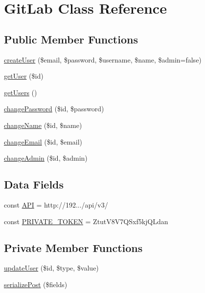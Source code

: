 \hypertarget{class_git_lab}{}\section{Git\+Lab Class Reference}
\label{class_git_lab}
\subsection*{Public Member Functions}
\begin{DoxyCompactItemize}
\item 
\hyperlink{class_git_lab_ad4673e3ab86e44e554d444421241a8a1}{create\+User} (\$email, \$password, \$username, \$name, \$admin=false)
\item 
\hyperlink{class_git_lab_a2b589778b482371e1539bc994300c1e5}{get\+User} (\$id)
\item 
\hyperlink{class_git_lab_a0fc10b64683021b70c7eb95fb514c119}{get\+Users} ()
\item 
\hyperlink{class_git_lab_a592a238ea58e065b512fc723304f7f29}{change\+Password} (\$id, \$password)
\item 
\hyperlink{class_git_lab_aea3aab26df5bf7398aea5e84d2a85129}{change\+Name} (\$id, \$name)
\item 
\hyperlink{class_git_lab_a4c1dd994f79ecf289df6fc1f91c0e19e}{change\+Email} (\$id, \$email)
\item 
\hyperlink{class_git_lab_ad0088df13f1b2dd3eec34f0984ac07e4}{change\+Admin} (\$id, \$admin)
\end{DoxyCompactItemize}
\subsection*{Data Fields}
\begin{DoxyCompactItemize}
\item 
const \hyperlink{class_git_lab_ad629fa048bd788fc4a4ed613628423cb}{A\+P\+I} = \textquotesingle{}http\+://192.../api/v3/\textquotesingle{}
\item 
const \hyperlink{class_git_lab_a7bd2a018127059c3e72902d45e7913d0}{P\+R\+I\+V\+A\+T\+E\+\_\+\+T\+O\+K\+E\+N} = \textquotesingle{}Ztut\+V8\+V7\+Q\+Sxf5kj\+Q\+Ldan\textquotesingle{}
\end{DoxyCompactItemize}
\subsection*{Private Member Functions}
\begin{DoxyCompactItemize}
\item 
\hyperlink{class_git_lab_ad0b8c8156fd5c1883923b2d3a97faae4}{update\+User} (\$id, \$type, \$value)
\item 
\hyperlink{class_git_lab_a7e79fd18a7f50b35962f2a96ba67c676}{serialize\+Post} (\$fields)
\end{DoxyCompactItemize}


